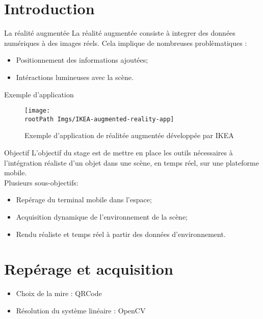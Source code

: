 \documentclass{beamer}
\newcommand*{\rootPath}{}
\begin{document}
\frame{\titlepage}


\section{Introduction}

\begin{frame}{La réalité augmentée}
	La réalité augmentée consiste à integrer des données numériques à des images réels. Cela implique de nombreuses problèmatiques :
	\begin{itemize}
		\item Positionnement des informations ajoutées;
		\item Intéractions lumineuses avec la scène.
	\end{itemize}
\end{frame}


\begin{frame}{Exemple d'application}
	\begin{figure}
		\centering
		\texttt{[image: \\rootPath Imgs/IKEA-augmented-reality-app]}
		\caption{Exemple d'application de réalitée augmentée développée par IKEA}
	\end{figure}
\end{frame}


\begin{frame}{Objectif}
	L'objectif du stage est de mettre en place les outils nécessaires à l'intégration réaliste d'un objet dans une scène, en temps réel, sur une plateforme mobile.\\[.5cm]
	Plusieurs sous-objectifs:
	\begin{itemize}
		\item Repérage du terminal mobile dans l'espace;
		\item Acquisition dynamique de l'environnement de la scène;
		\item Rendu réaliste et temps réel à partir des données d'environnement.
	\end{itemize}
\end{frame}


\section{Repérage et acquisition}

\begin{frame}
	\begin{itemize}[<+->]
		\item Choix de la mire : QRCode
		\item Résolution du système linéaire : OpenCV
	\end{itemize}
\end{frame}
\end{document}
